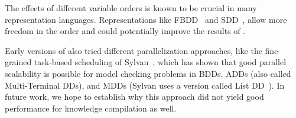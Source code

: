 The effects of different variable orders is known to be crucial in many representation languages. Representations like FBDD~\cite{darwiche2002knowledge} and SDD~\cite{darwiche2011sdd}, allow more freedom in the order and could potentially improve the results of \toolname.

Early versions of \toolname also tried different parallelization approaches, like the fine-grained task-based scheduling of Sylvan~\cite{van2013multi}, which has shown that good parallel scalability is possible for model checking problems in BDDs, ADDs (also called Multi-Terminal DDs), and MDDs (Sylvan uses a version called List DD~\cite{sylvan-journal}). In future work, we hope to establish why this approach did not yield good performance for knowledge compilation as well.




